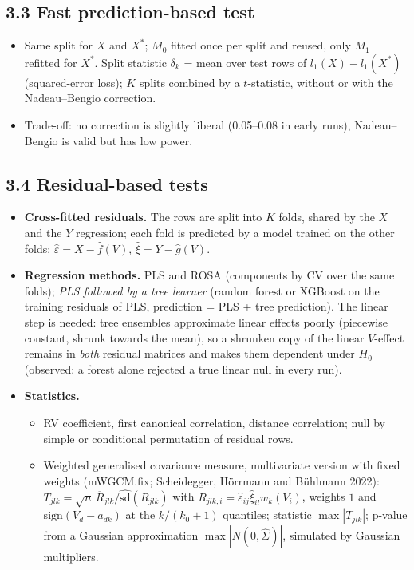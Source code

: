 \documentclass[10pt,leqno]{amsart}
\begin{document}
\subsection*{3.3 Fast prediction-based test}
\begin{itemize}
\item Same split for $X$ and $X^*$; $M_0$ fitted once per split and reused, only $M_1$
  refitted for $X^*$. Split statistic $\delta_k$ = mean over test rows of
  $l_1(X)-l_1(X^*)$ (squared-error loss); $K$ splits combined by a $t$-statistic,
  without or with the Nadeau--Bengio correction.
\item Trade-off: no correction is slightly liberal (0.05--0.08 in early runs),
  Nadeau--Bengio is valid but has low power.
\end{itemize}

\subsection*{3.4 Residual-based tests}
\begin{itemize}
\item \textbf{Cross-fitted residuals.} The rows are split into $K$ folds, shared by
  the $X$ and the $Y$ regression; each fold is predicted by a model trained on the
  other folds: $\hat\varepsilon=X-\hat f(V)$, $\hat\xi=Y-\hat g(V)$.
\item \textbf{Regression methods.} PLS and ROSA (components by CV over the same
  folds); \emph{PLS followed by a tree learner} (random forest or XGBoost on the
  training residuals of PLS, prediction = PLS + tree prediction). The linear step
  is needed: tree ensembles approximate linear effects poorly (piecewise constant,
  shrunk towards the mean), so a shrunken copy of the linear $V$-effect remains in
  \emph{both} residual matrices and makes them dependent under $H_0$ (observed:
  a forest alone rejected a true linear null in every run).
\item \textbf{Statistics.}
  \begin{itemize}
  \item RV coefficient, first canonical correlation, distance correlation; null by
    simple or conditional permutation of residual rows.
  \item Weighted generalised covariance measure, multivariate version with fixed
    weights (mWGCM.fix; Scheidegger, H\"orrmann and B\"uhlmann 2022):
    $T_{jlk}=\sqrt{n}\,\overline{R}_{jlk}/\widehat{\mathrm{sd}}(R_{jlk})$ with
    $R_{jlk,i}=\hat\varepsilon_{ij}\hat\xi_{il}w_k(V_i)$, weights $1$ and
    $\mathrm{sign}(V_d-a_{dk})$ at the $k/(k_0+1)$ quantiles; statistic
    $\max|T_{jlk}|$; p-value from a Gaussian approximation
    $\max|N(0,\hat\Sigma)|$, simulated by Gaussian multipliers.
  \end{itemize}
\end{itemize}
\end{document}
